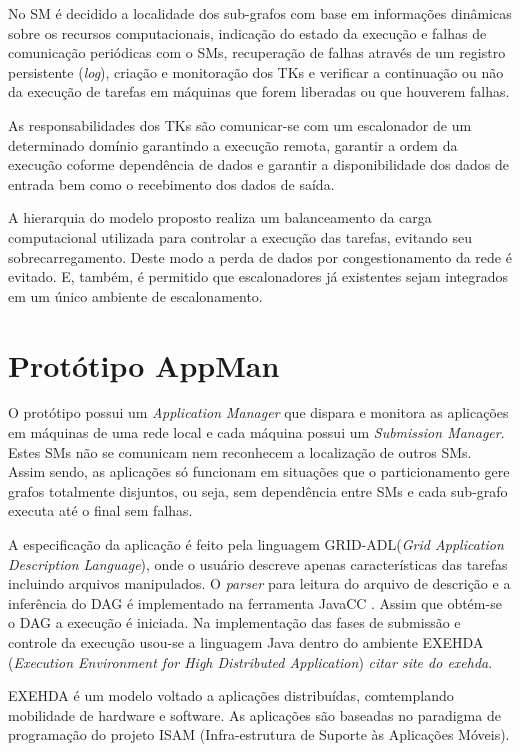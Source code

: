 No SM é decidido a localidade dos sub-grafos com base em informações dinâmicas sobre os recursos computacionais, indicação do estado da execução e falhas de comunicação periódicas com o SMs, recuperação de falhas através de um registro persistente (\emph{log}), criação e monitoração dos TKs e verificar a continuação ou não da execução de tarefas em máquinas que forem liberadas ou que houverem falhas.

As responsabilidades dos TKs são comunicar-se com um escalonador de um determinado domínio garantindo a execução remota, garantir a ordem da execução coforme dependência de dados e garantir a disponibilidade dos dados de entrada bem como o recebimento dos dados de saída.

A hierarquia do modelo proposto realiza um balanceamento da carga computacional utilizada para controlar a execução das tarefas, evitando seu sobrecarregamento. Deste modo a perda de dados por congestionamento da rede é evitado. E, também, é permitido que escalonadores já existentes sejam integrados em um único ambiente de escalonamento.

\section{Protótipo AppMan}

O protótipo possui um \emph{Application Manager} que dispara e monitora as aplicações em máquinas de uma rede local e cada máquina possui um \emph{Submission Manager}. Estes SMs não se comunicam nem reconhecem a localização de outros SMs. Assim sendo, as aplicações só funcionam em situações que o particionamento gere grafos totalmente disjuntos, ou seja, sem dependência entre SMs e cada sub-grafo executa até o final sem falhas.

A especificação da aplicação é feito pela linguagem GRID-ADL(\emph{Grid Application Description Language}), onde o usuário descreve apenas características das tarefas incluindo arquivos manipulados. O \emph{parser} para leitura do arquivo de descrição e a inferência do DAG é implementado na ferramenta JavaCC \cite{javacc}. Assim que obtém-se o DAG a execução é iniciada. Na implementação das fases de submissão e controle da execução usou-se a linguagem Java dentro do ambiente EXEHDA (\emph{Execution Environment for High Distributed Application}) \emph{citar site do exehda}.

EXEHDA é um modelo voltado a aplicações distribuídas, comtemplando mobilidade de hardware e software. As aplicações são baseadas no paradigma de programação do projeto ISAM (Infra-estrutura de Suporte às Aplicações Móveis).

